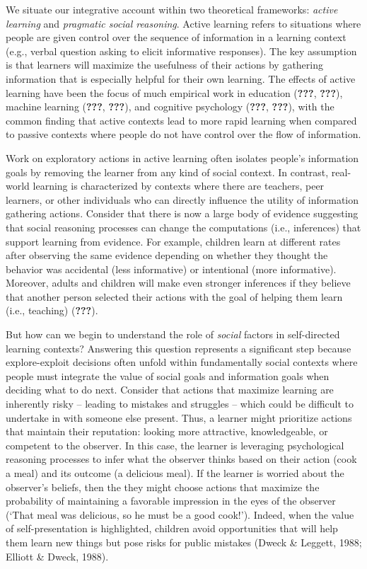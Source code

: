 \documentclass[10pt, letterpaper]{article}
\begin{document}
We situate our integrative account within two theoretical frameworks:
\emph{active learning} and \emph{pragmatic social reasoning}. Active
learning refers to situations where people are given control over the
sequence of information in a learning context (e.g., verbal question
asking to elicit informative responses). The key assumption is that
learners will maximize the usefulness of their actions by gathering
information that is especially helpful for their own learning. The
effects of active learning have been the focus of much empirical work in
education ({\textbf{???}}, {\textbf{???}}), machine learning
({\textbf{???}}, {\textbf{???}}), and cognitive psychology
({\textbf{???}}, {\textbf{???}}), with the common finding that active
contexts lead to more rapid learning when compared to passive contexts
where people do not have control over the flow of information.

Work on exploratory actions in active learning often isolates people's
information goals by removing the learner from any kind of social
context. In contrast, real-world learning is characterized by contexts
where there are teachers, peer learners, or other individuals who can
directly influence the utility of information gathering actions.
Consider that there is now a large body of evidence suggesting that
social reasoning processes can change the computations (i.e.,
inferences) that support learning from evidence. For example, children
learn at different rates after observing the same evidence depending on
whether they thought the behavior was accidental (less informative) or
intentional (more informative). Moreover, adults and children will make
even stronger inferences if they believe that another person selected
their actions with the goal of helping them learn (i.e., teaching)
({\textbf{???}}).

But how can we begin to understand the role of \emph{social} factors in
self-directed learning contexts? Answering this question represents a
significant step because explore-exploit decisions often unfold within
fundamentally social contexts where people must integrate the value of
social goals and information goals when deciding what to do next.
Consider that actions that maximize learning are inherently risky --
leading to mistakes and struggles -- which could be difficult to
undertake in with someone else present. Thus, a learner might prioritize
actions that maintain their reputation: looking more attractive,
knowledgeable, or competent to the observer. In this case, the learner
is leveraging psychological reasoning processes to infer what the
observer thinks based on their action (cook a meal) and its outcome (a
delicious meal). If the learner is worried about the observer's beliefs,
then the they might choose actions that maximize the probability of
maintaining a favorable impression in the eyes of the observer (`That
meal was delicious, so he must be a good cook!'). Indeed, when the value
of self-presentation is highlighted, children avoid opportunities that
will help them learn new things but pose risks for public mistakes
(Dweck \& Leggett, 1988; Elliott \& Dweck, 1988).
\end{document}
